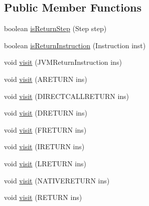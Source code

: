 \subsection*{Public Member Functions}
\begin{DoxyCompactItemize}
\item 
boolean \hyperlink{classgov_1_1nasa_1_1jpf_1_1inspector_1_1server_1_1pathanalysis_1_1_check_return_instruction_a5ea5a6c2fb609511ee50274b14022fad}{is\+Return\+Step} (Step step)
\item 
boolean \hyperlink{classgov_1_1nasa_1_1jpf_1_1inspector_1_1server_1_1pathanalysis_1_1_check_return_instruction_a718157ecd57c3178a35598f3d7adc5dc}{is\+Return\+Instruction} (Instruction inst)
\item 
void \hyperlink{classgov_1_1nasa_1_1jpf_1_1inspector_1_1server_1_1pathanalysis_1_1_check_return_instruction_a91236c6e439b5c65c39919cd7d3162a6}{visit} (J\+V\+M\+Return\+Instruction ins)
\item 
void \hyperlink{classgov_1_1nasa_1_1jpf_1_1inspector_1_1server_1_1pathanalysis_1_1_check_return_instruction_af28281b1b259bf4445a58e9f72bc7b35}{visit} (A\+R\+E\+T\+U\+RN ins)
\item 
void \hyperlink{classgov_1_1nasa_1_1jpf_1_1inspector_1_1server_1_1pathanalysis_1_1_check_return_instruction_a8bf510d9a2ac3d8273b9f6e018a82d7a}{visit} (D\+I\+R\+E\+C\+T\+C\+A\+L\+L\+R\+E\+T\+U\+RN ins)
\item 
void \hyperlink{classgov_1_1nasa_1_1jpf_1_1inspector_1_1server_1_1pathanalysis_1_1_check_return_instruction_a26d3007a9b98b9b6f4d097358f9d475f}{visit} (D\+R\+E\+T\+U\+RN ins)
\item 
void \hyperlink{classgov_1_1nasa_1_1jpf_1_1inspector_1_1server_1_1pathanalysis_1_1_check_return_instruction_a312cec21e8fb2d28e5fc97e047e4425e}{visit} (F\+R\+E\+T\+U\+RN ins)
\item 
void \hyperlink{classgov_1_1nasa_1_1jpf_1_1inspector_1_1server_1_1pathanalysis_1_1_check_return_instruction_afab7e16780323836dfe516a21997d635}{visit} (I\+R\+E\+T\+U\+RN ins)
\item 
void \hyperlink{classgov_1_1nasa_1_1jpf_1_1inspector_1_1server_1_1pathanalysis_1_1_check_return_instruction_a699d2b45300ddf6440a6f94637be2ab7}{visit} (L\+R\+E\+T\+U\+RN ins)
\item 
void \hyperlink{classgov_1_1nasa_1_1jpf_1_1inspector_1_1server_1_1pathanalysis_1_1_check_return_instruction_a7e78e4af8b43ba8a55c1329fd506fe06}{visit} (N\+A\+T\+I\+V\+E\+R\+E\+T\+U\+RN ins)
\item 
void \hyperlink{classgov_1_1nasa_1_1jpf_1_1inspector_1_1server_1_1pathanalysis_1_1_check_return_instruction_a577535adda47e9296a37c408c2f5b285}{visit} (R\+E\+T\+U\+RN ins)
\end{DoxyCompactItemize}
